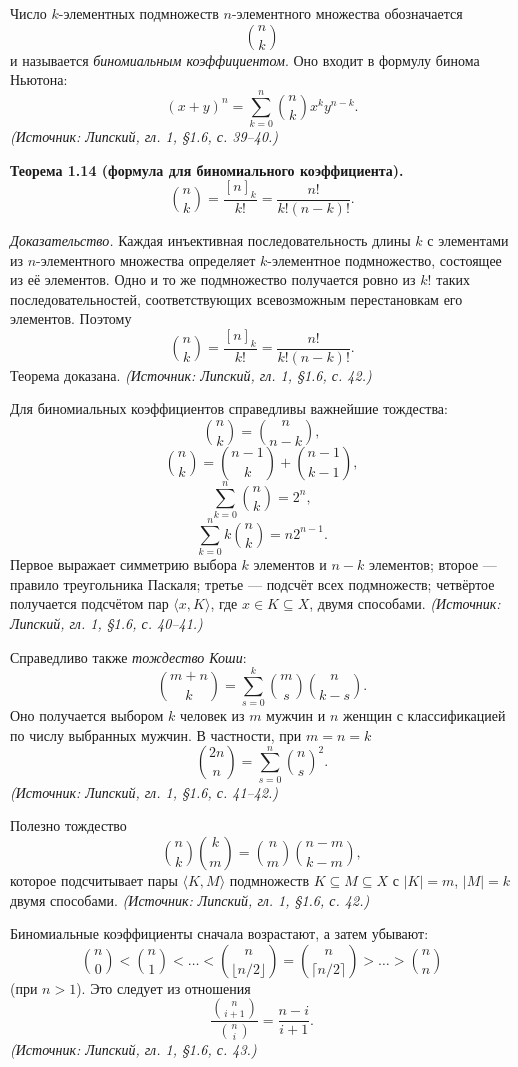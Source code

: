 \documentclass[a4paper,12pt]{article}
\begin{document}
Число \(k\)-элементных подмножеств \(n\)-элементного множества обозначается
\[
\binom{n}{k}
\]
и называется \emph{биномиальным коэффициентом}. Оно входит в формулу бинома Ньютона:
\[
(x+y)^n=\sum_{k=0}^n \binom{n}{k}x^k y^{n-k}.
\]
\textit{(Источник: Липский, гл. 1, §1.6, с. 39--40.)}

\textbf{Теорема 1.14 (формула для биномиального коэффициента).}
\[
\binom{n}{k}=\frac{[n]_k}{k!}=\frac{n!}{k!(n-k)!}.
\]

\emph{Доказательство.} Каждая инъективная последовательность длины \(k\) с элементами из \(n\)-элементного множества определяет \(k\)-элементное подмножество, состоящее из её элементов. Одно и то же подмножество получается ровно из \(k!\) таких последовательностей, соответствующих всевозможным перестановкам его элементов. Поэтому
\[
\binom{n}{k}=\frac{[n]_k}{k!}=\frac{n!}{k!(n-k)!}.
\]
Теорема доказана.
\textit{(Источник: Липский, гл. 1, §1.6, с. 42.)}

Для биномиальных коэффициентов справедливы важнейшие тождества:
\[
\binom{n}{k}=\binom{n}{n-k},
\]
\[
\binom{n}{k}=\binom{n-1}{k}+\binom{n-1}{k-1},
\]
\[
\sum_{k=0}^n \binom{n}{k}=2^n,
\]
\[
\sum_{k=0}^n k\binom{n}{k}=n2^{n-1}.
\]
Первое выражает симметрию выбора \(k\) элементов и \(n-k\) элементов; второе --- правило треугольника Паскаля; третье --- подсчёт всех подмножеств; четвёртое получается подсчётом пар \(\langle x,K\rangle\), где \(x\in K\subseteq X\), двумя способами.
\textit{(Источник: Липский, гл. 1, §1.6, с. 40--41.)}

Справедливо также \emph{тождество Коши}:
\[
\binom{m+n}{k}=\sum_{s=0}^k \binom{m}{s}\binom{n}{k-s}.
\]
Оно получается выбором \(k\) человек из \(m\) мужчин и \(n\) женщин с классификацией по числу выбранных мужчин. В частности, при \(m=n=k\)
\[
\binom{2n}{n}=\sum_{s=0}^n \binom{n}{s}^2.
\]
\textit{(Источник: Липский, гл. 1, §1.6, с. 41--42.)}

Полезно тождество
\[
\binom{n}{k}\binom{k}{m}=\binom{n}{m}\binom{n-m}{k-m},
\]
которое подсчитывает пары \(\langle K,M\rangle\) подмножеств \(K\subseteq M\subseteq X\) с \(|K|=m\), \(|M|=k\) двумя способами.
\textit{(Источник: Липский, гл. 1, §1.6, с. 42.)}

Биномиальные коэффициенты сначала возрастают, а затем убывают:
\[
\binom{n}{0}<\binom{n}{1}<\dots<\binom{n}{\lfloor n/2\rfloor}
=
\binom{n}{\lceil n/2\rceil}
>\dots>\binom{n}{n}
\]
(при \(n>1\)). Это следует из отношения
\[
\frac{\binom{n}{i+1}}{\binom{n}{i}}=\frac{n-i}{i+1}.
\]
\textit{(Источник: Липский, гл. 1, §1.6, с. 43.)}
\end{document}
